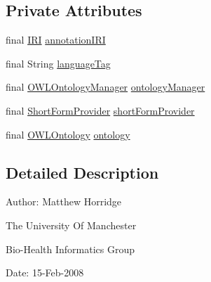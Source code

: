 \subsection*{Private Attributes}
\begin{DoxyCompactItemize}
\item 
final \hyperlink{classorg_1_1semanticweb_1_1owlapi_1_1model_1_1_i_r_i}{I\-R\-I} \hyperlink{classorg_1_1semanticweb_1_1owlapi_1_1_short_form2_annotation_generator_a311b218ccc4824d12a9568d5917a4190}{annotation\-I\-R\-I}
\item 
final String \hyperlink{classorg_1_1semanticweb_1_1owlapi_1_1_short_form2_annotation_generator_a16eddeb90a4bbed1b269e98aebc8b66e}{language\-Tag}
\item 
final \hyperlink{interfaceorg_1_1semanticweb_1_1owlapi_1_1model_1_1_o_w_l_ontology_manager}{O\-W\-L\-Ontology\-Manager} \hyperlink{classorg_1_1semanticweb_1_1owlapi_1_1_short_form2_annotation_generator_a07ad54022df10cb12a53b5a51ce0a214}{ontology\-Manager}
\item 
final \hyperlink{interfaceorg_1_1semanticweb_1_1owlapi_1_1util_1_1_short_form_provider}{Short\-Form\-Provider} \hyperlink{classorg_1_1semanticweb_1_1owlapi_1_1_short_form2_annotation_generator_aa43517d574c67137ab5762d82e650b64}{short\-Form\-Provider}
\item 
final \hyperlink{interfaceorg_1_1semanticweb_1_1owlapi_1_1model_1_1_o_w_l_ontology}{O\-W\-L\-Ontology} \hyperlink{classorg_1_1semanticweb_1_1owlapi_1_1_short_form2_annotation_generator_aad6ad51bffee247a43af5842a94b70fd}{ontology}
\end{DoxyCompactItemize}


\subsection{Detailed Description}
Author\-: Matthew Horridge\par
 The University Of Manchester\par
 Bio-\/\-Health Informatics Group\par
 Date\-: 15-\/\-Feb-\/2008\par
\par
 

